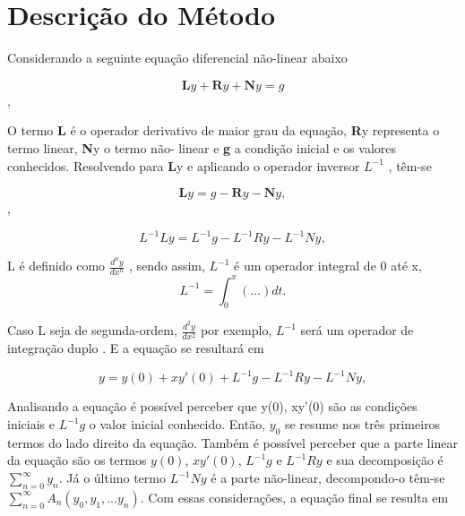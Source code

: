  
  
   

\section{Descrição do Método} 
 
 
 Considerando a seguinte equação diferencial não-linear abaixo
 
 \begin{equation}  \textbf{L}y +  \textbf{R}y +  \textbf{N}y = g\end{equation},

O termo \textbf{L} é o operador derivativo de maior grau da equação, \textbf{R}y representa o termo linear, \textbf{N}y o termo não- linear e \textbf{g} a condição inicial e os valores conhecidos. Resolvendo para \textbf{L}y  e aplicando o operador inversor $L^{-1}$ , têm-se

 \begin{equation}  \textbf{L}y =  g - \textbf{R}y - \textbf{N}y,\end{equation},
 
  
  \begin{equation}
L^{-1}Ly =  L^{-1}g -  L^{-1}Ry -  L^{-1}Ny,
  \end{equation}
  
  L é definido como $\frac{d^ny }{d x^n}$ , sendo assim, $L^{-1}$ é um operador integral de 0 até x,
  \begin{equation}
  L^{-1}= \int_0^{x} (...) dt.
  \end{equation}
  
  Caso L seja de segunda-ordem, $\frac{d^2y}{d x^2}$ por exemplo, $L^{-1}$ será um operador de integração duplo . E a equação se resultará em
  
  \begin{equation}
  y= y(0) + xy'(0) + L^{-1}g - L^{-1}Ry - L^{-1}Ny,
  \end{equation}

Analisando a equação é possível perceber que y(0), xy'(0) são as condições iniciais e $L^{-1}g$ o valor inicial conhecido. Então, $y_{0}$ se resume nos três primeiros termos do lado direito da equação. Também é possível perceber que a parte linear da equação são os termos $y(0)$, $xy'(0)$, $L^{-1}g$ e $L^{-1}Ry$ e sua decomposição é $\sum_{n=0}^{\infty} y_{n}$. Já  o último termo $L^{-1}Ny$ é a parte não-linear, decompondo-o têm-se $\sum_{n=0}^{\infty} A_{n}(y_{0},y_{1},...y_{n})$. Com essas considerações, a equação final se resulta em
 
